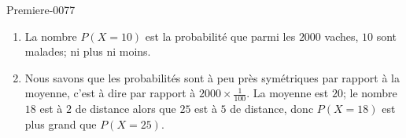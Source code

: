 
\begin{corrige}{Premiere-0077}

    \begin{enumerate}
        \item
            La nombre \( P(X=10)\) est la probabilité que parmi les \( 2000\) vaches, \( 10\) sont malades; ni plus ni moins.
        \item
            Nous savons que les probabilités sont à peu près symétriques par rapport à la moyenne, c'est à dire par rapport à \( 2000\times \frac{1}{ 100 }\). La moyenne est \( 20\); le nombre \( 18\) est à \( 2\) de distance alors que \( 25\) est à \( 5\) de distance, donc \( P(X=18)\) est plus grand que \( P(X=25)\).
    \end{enumerate}

\end{corrige}
